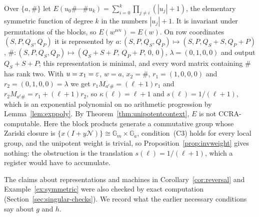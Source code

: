 \begin{example}\label{ex:symmetric}
Over $\{a,\#\}$ let $E(u_0\#\cdots\#u_k)=\sum_{i=0}^k\prod_{j\ne i}(|u_j|+1)$, the elementary symmetric function of degree $k$ in the numbers $|u_j|+1$. It is invariant under permutations of the blocks, so $E(w^{\mathrm{rev}})=E(w)$. On row coordinates $(S,P,Q_S,Q_P)$ it is represented by $a:(S,P,Q_S,Q_P)\mapsto(S,P,Q_S+S,Q_P+P)$, $\#:(S,P,Q_S,Q_P)\mapsto(Q_S+S+P,\,Q_P+P,\,0,\,0)$, $\lambda=(0,1,0,0)$ and output $Q_S+S+P$; this representation is minimal, and every word matrix containing $\#$ has rank two. With $u=x_1=\varepsilon$, $w=a$, $x_2=\#$, $r_1=(1,0,0,0)$ and $r_2=(0,1,0,0)=\lambda$ we get $r_1M_{a^\ell\#}=(\ell+1)r_1$ and $r_2M_{a^\ell\#}=r_1+(\ell+1)r_2$, so $\kappa(\ell)=\ell+1$ and $s(\ell)=1/(\ell+1)$, which is an exponential polynomial on no arithmetic progression by Lemma~\ref{lem:exppoly}. By Theorem~\ref{thm:unipotentcontext}, $E$ is not CCRA-computable. Here the block products generate a commutative group whose Zariski closure is $\{x(I+y\mathcal N)\}\cong\mathbb G_m\times\mathbb G_a$, condition~(C3) holds for every local group, and the unipotent weight is trivial, so Proposition~\ref{prop:invweight} gives nothing: the obstruction is the translation $s(\ell)=1/(\ell+1)$, which a register would have to accumulate.
\end{example}

The claims about representations and machines in Corollary~\ref{cor:reversal} and Example~\ref{ex:symmetric} were also checked by exact computation (Section~\ref{sec:singular-checks}). We record what the earlier necessary conditions say about $g$ and $h$.

